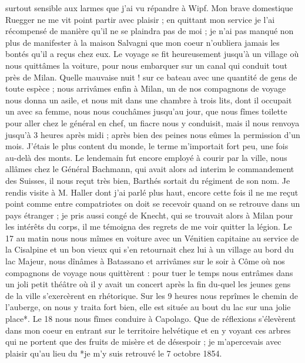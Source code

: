 \documentclass[12pt]{article}
\begin{document}
 surtout sensible aux larmes que j’ai vu
répandre à Wipf. Mon brave domestique Ruegger ne me vit point partir avec plaisir ; en quittant mon
service je l’ai récompensé de manière qu’il ne se plaindra pas de moi ; je n’ai pas manqué non plus
de manifester à la maison Salvagni que mon coeur n’oubliera jamais les bontés qu’il a reçus chez
eux. Le voyage se fit heureusement jusqu’à un village où nous quittâmes la voiture, pour nous
embarquer sur un canal qui conduit tout près de Milan. Quelle mauvaise nuit ! sur ce bateau avec une
quantité de gens de toute espèce ; nous arrivâmes enfin à Milan, un de nos compagnons de voyage nous
donna un asile, et nous mit dans une chambre à trois lits, dont il occupait un avec sa femme, nous
nous couchâmes jusqu’au jour, que nous fîmes toilette pour aller chez le général en chef, un fiacre
nous y conduisit, mais il nous renvoya jusqu’à 3 heures après midi ; après bien des peines nous
eûmes la permission d’un mois. J’étais le plus content du monde, le terme m’importait fort peu, une
fois au-delà des monts. Le lendemain fut encore employé à courir par la ville, nous allâmes chez le
Général Bachmann, qui avait alors ad interim le commandement des Suisses, il nous reçut très bien,
Barthés sortait du régiment de son nom. Je rendis visite à M. Haller dont j’ai parlé plus haut,
encore cette fois il ne me reçut point comme entre compatriotes on doit se recevoir quand on se
retrouve dans un pays étranger ; je pris aussi congé de Knecht, qui se trouvait alors à Milan pour
les intérêts du corps, il me témoigna des regrets de me voir quitter la légion. Le 17 au matin nous
nous mîmes en voiture avec un Vénitien capitaine au service de la Cisalpine et un bon vieux qui s’en
retournait chez lui à un village au bord du lac Majeur, nous dînâmes à Batassano et arrivâmes sur le
soir à Côme où nos compagnons de voyage nous quittèrent : pour tuer le temps nous entrâmes dans un
joli petit théâtre où il y avait un concert après la fin du-quel les jeunes gens de la ville
s’exercèrent en rhétorique. Sur les 9 heures nous reprîmes le chemin de l’auberge, on nous y traita
fort bien, elle est située au bout du lac sur una jolie place*. Le 18 nous nous fîmes conduire à
Capolago. Que de réflexions s’élevèrent dans mon coeur en entrant sur le territoire helvétique et en
y voyant ces arbres qui ne portent que des fruits de misère et de désespoir ; je m’apercevais avec
plaisir qu’au lieu du *je m’y suis retrouvé le 7 octobre 1854.
\end{document}
